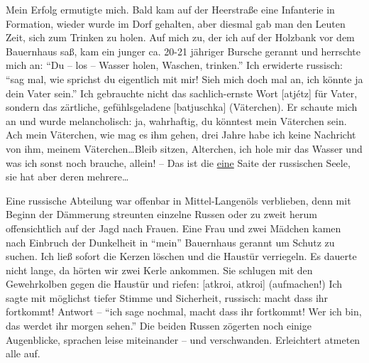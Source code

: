 Mein Erfolg ermutigte mich. Bald kam auf der Heerstraße eine Infanterie in Formation, wieder wurde im Dorf gehalten, aber diesmal gab man den Leuten Zeit, sich zum Trinken zu holen. Auf mich zu, der ich auf der Holzbank vor dem Bauernhaus saß, kam ein junger ca. 20-21 jähriger Bursche gerannt und herrschte mich an: \enquote{Du -- los -- Wasser holen, Waschen, trinken.} Ich erwiderte russisch: \enquote{sag mal, wie sprichst du eigentlich mit mir! Sieh mich doch mal an, ich könnte ja dein Vater sein.} Ich gebrauchte nicht das sachlich-ernste Wort  [atjétz] für Vater, sondern das zärtliche, gefühlsgeladene  [batjuschka] (Väterchen). Er schaute mich an und wurde melancholisch: ja, wahrhaftig, du könntest mein Väterchen sein. Ach mein Väterchen, wie mag es ihm gehen, drei Jahre habe ich keine Nachricht von ihm, meinem Väterchen\dots Bleib  sitzen, Alterchen, ich hole mir das Wasser und was ich sonst noch brauche, allein! -- Das ist die \underline{eine} Saite der russischen Seele, sie hat aber deren mehrere\dots

Eine russische Abteilung war offenbar in Mittel-Langenöls verblieben, denn mit Beginn der Dämmerung streunten einzelne Russen oder zu zweit herum offensichtlich auf der Jagd nach Frauen. Eine Frau und zwei Mädchen kamen nach Einbruch der Dunkelheit in \enquote{mein} Bauernhaus gerannt um Schutz zu suchen. Ich ließ sofort die Kerzen löschen und die Haustür verriegeln. Es dauerte nicht lange, da hörten wir zwei Kerle ankommen. Sie schlugen mit den Gewehrkolben gegen die Haustür und riefen:  [atkroi, atkroi] (aufmachen!) Ich sagte mit möglichst tiefer Stimme und Sicherheit, russisch: macht dass ihr fortkommt! Antwort -- \enquote{ich sage nochmal, macht dass ihr fortkommt! Wer ich bin, das werdet ihr morgen sehen.} Die beiden Russen zögerten noch einige Augenblicke, sprachen leise miteinander -- und verschwanden. Erleichtert atmeten alle auf.

